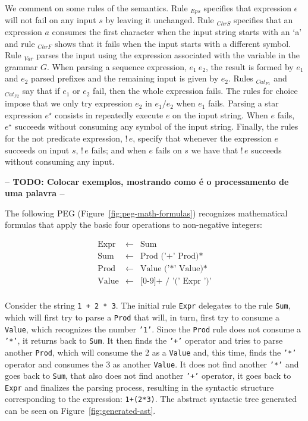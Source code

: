 We comment on some rules of the semantics. Rule \(_{Eps}\) specifies that
expression \(\epsilon\) will not fail on any input \(s\) by leaving it unchanged.
Rule \(_{ChrS}\) specifies that an expression \(a\) consumes the first character when
the input string starts with an `a' and rule \(_{ChrF}\) shows that it fails when
the input starts with a different symbol. Rule \(_{Var}\) parses the input using
the expression associated with the variable in the grammar \(G\). When parsing a
sequence expression, \(e_1\:e_2\), the result is formed by \(e_1\) and \(e_2\) parsed
prefixes and the remaining input is given by \(e_2\). Rules \(_{Cat_{F1}}\) and
\(_{Cat_{F2}}\) say that if \(e_1\) or \(e_2\) fail, then the whole expression fails.
The rules for choice impose that we only try
expression \(e_2\) in \(e_1 / e_2\) when \(e_1\) fails. Parsing a star
expression \(e^\star\) consists in repeatedly execute \(e\) on the input string.
When \(e\) fails, \(e^\star\) succeeds without consuming any symbol of the input
string. Finally, the rules for the not predicate expression, \(!\,e\), specify
that whenever the expression \(e\) succeeds on input \(s\), \(!\,e\) fails; and when \(e\)
fails on \(s\) we have that \(!\,e\) succeeds without consuming any input.

\textbf{-- TODO: Colocar exemplos, mostrando como é o processamento de uma palavra --}

The following PEG (Figure~\ref{fig:peg-math-formulas}) recognizes mathematical formulas that apply the basic four
operations to non-negative integers:

\begin{figure*}[ht]
   \centering
   \[
      \begin{array}{lcl}
         \text{Expr}  & \leftarrow & \text{Sum} \\
         \text{Sum}   & \leftarrow & \text{Prod ('+' Prod)*} \\
         \text{Prod}  & \leftarrow & \text{Value ('*' Value)*} \\
         \text{Value} & \leftarrow & \text{[0-9]+ / '(' Expr ')'} \\
      \end{array}
   \] 
   \caption{PEG for mathematical formulas.}   
   \label{fig:peg-math-formulas}
\end{figure*}

Consider the string \texttt{1 + 2 * 3}. The initial rule \texttt{Expr} delegates 
to the rule \texttt{Sum}, which will first try to parse a \texttt{Prod} that will, 
in turn, first try to consume a \texttt{Value}, which recognizes the number \texttt{'1'}.
Since the \texttt{Prod} rule does not consume a \texttt{'*'}, it returns back to 
\texttt{Sum}. It then finds the \texttt{'+'} operator and tries to parse another 
\texttt{Prod}, which will consume the 2 as a \texttt{Value} and, this time, finds
the \texttt{'*'} operator and consumes the 3 as another \texttt{Value}. It does 
not find another \texttt{'*'} and goes back to \texttt{Sum}, that also does not
find another \texttt{'+'} operator, it goes back to \texttt{Expr} and finalizes
the parsing process, resulting in the syntactic structure corresponding to the
expression: \texttt{1+(2*3)}. The abstract syntactic tree generated can be seen
on Figure~\ref{fig:generated-ast}.

